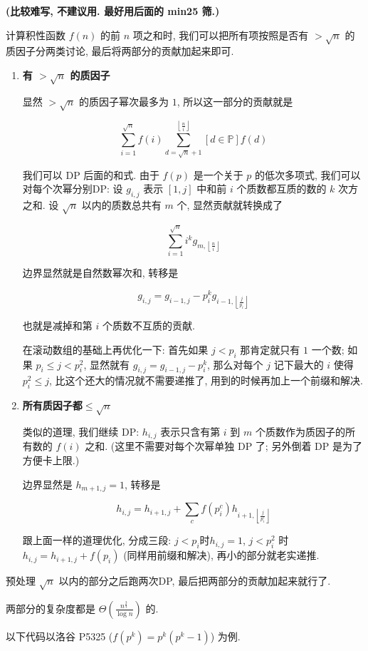 \textbf{(比较难写, 不建议用. 最好用后面的 min25 筛.)}

计算积性函数 $f(n)$ 的前 $n$ 项之和时, 我们可以把所有项按照是否有 $> \sqrt n$ 的质因子分两类讨论, 最后将两部分的贡献加起来即可.

\begin{enumerate}
	
\item \textbf{有 $> \sqrt n$ 的质因子}

显然 $> \sqrt n$ 的质因子幂次最多为 $1$, 所以这一部分的贡献就是

$$ \sum_{i = 1} ^ {\sqrt n} f(i) \sum_{d = \sqrt n + 1} ^ {\left\lfloor \frac n i \right\rfloor} \left[ d \in \mathbb{P} \right] f(d) $$

我们可以 DP 后面的和式. 由于 $f(p)$ 是一个关于 $p$ 的低次多项式, 我们可以对每个次幂分别DP: 设 $g_{i, j}$ 表示 $[1, j]$ 中和前 $i$ 个质数都互质的数的 $k$ 次方之和. 设 $\sqrt n$ 以内的质数总共有 $m$ 个, 显然贡献就转换成了

$$ \sum_{i = 1} ^ {\sqrt n} i ^ k g_{m, \left\lfloor \frac n i \right\rfloor} $$

边界显然就是自然数幂次和, 转移是

$$ g_{i, j} = g_{i - 1, j} - p_i ^ k g_{i - 1, \left\lfloor \frac j {p_i} \right\rfloor} $$

也就是减掉和第 $i$ 个质数不互质的贡献.

在滚动数组的基础上再优化一下: 首先如果 $j < p_i$ 那肯定就只有 $1$ 一个数; 如果 $p_i \le j < p_i ^ 2$, 显然就有 $g_{i, j} = g_{i - 1, j} - p_i ^ k$, 那么对每个 $j$ 记下最大的 $i$ 使得 $p_i ^ 2 \le j$, 比这个还大的情况就不需要递推了, 用到的时候再加上一个前缀和解决.

\item \textbf{所有质因子都$\le \sqrt n$}

类似的道理, 我们继续 DP: $h_{i, j}$ 表示只含有第 $i$ 到 $m$ 个质数作为质因子的所有数的 $f(i)$ 之和. (这里不需要对每个次幂单独 DP 了; 另外倒着 DP 是为了方便卡上限.)

边界显然是 $h_{m + 1, j} = 1$, 转移是

$$ h_{i, j} = h_{i + 1, j} + \sum_{c} f(p_i ^ c) h_{i + 1, \left\lfloor \frac j {p_i ^ c} \right\rfloor} $$

跟上面一样的道理优化, 分成三段: $j < p_i$时$h_{i, j} = 1$, $j < p_i ^ 2$ 时 $h_{i, j} = h_{i + 1, j} + f(p_i)$ (同样用前缀和解决), 再小的部分就老实递推.

\end{enumerate}

预处理 $\sqrt n$ 以内的部分之后跑两次DP, 最后把两部分的贡献加起来就行了.

两部分的复杂度都是 $\Theta \left( \frac {n ^ {\frac 3 4}} {\log n} \right)$ 的.

以下代码以洛谷 P5325 ($f(p^k) = p^k (p^k - 1)$) 为例.

\inputminted{cpp}{../src/numbertheory/洲阁筛.cpp}
